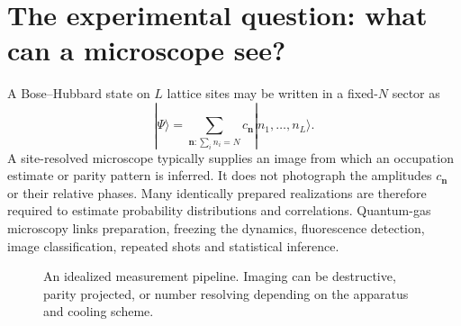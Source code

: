 \documentclass[11pt,a4paper]{article}
\begin{document}
\section{The experimental question: what can a microscope see?}
A Bose--Hubbard state on $L$ lattice sites may be written in a fixed-$N$ sector as
\begin{equation}|\Psi\rangle=\sum_{\mathbf n:\sum_i n_i=N}c_{\mathbf n}|n_1,\ldots,n_L\rangle.\label{eq:state}\end{equation}
A site-resolved microscope typically supplies an image from which an occupation estimate or parity pattern is inferred. It does not photograph the amplitudes $c_{\mathbf n}$ or their relative phases. Many identically prepared realizations are therefore required to estimate probability distributions and correlations. Quantum-gas microscopy links preparation, freezing the dynamics, fluorescence detection, image classification, repeated shots and statistical inference.
\begin{figure}[ht]\centering
{}
\caption{An idealized measurement pipeline. Imaging can be destructive, parity projected, or number resolving depending on the apparatus and cooling scheme.}
\end{figure}
\end{document}
